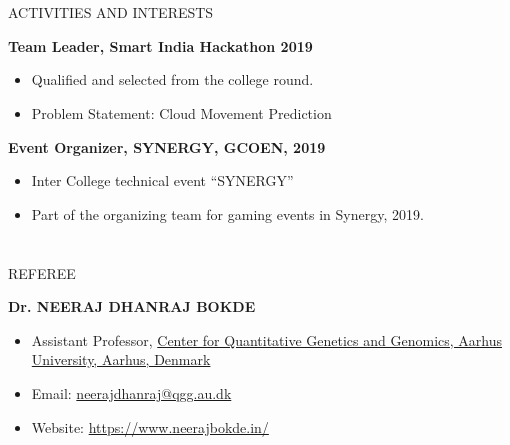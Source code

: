 \documentclass{my_cv}
\begin{document}
\begin{multicols}{2}
		
	\section{\faBaseballBall}{ACTIVITIES AND INTERESTS}
		
		\noindent
		\textbf{Team Leader, Smart India Hackathon 2019}
		\begin{itemize}
			\item Qualified and selected from the college round.
			\item Problem Statement: Cloud Movement Prediction
		\end{itemize}
		
		\noindent
		\textbf{Event Organizer, SYNERGY, GCOEN, 2019}
		\begin{itemize}
			\item Inter College technical event “SYNERGY”
			\item Part of the organizing team for gaming events in Synergy, 2019.
		\end{itemize}
	
	\columnbreak
	
	\section{\faUserFriends}{REFEREE}
	
		\textbf{Dr. NEERAJ DHANRAJ BOKDE}
		\begin{itemize}
			\item Assistant Professor, \href{http://qgg.au.dk/en/}{Center for Quantitative Genetics and Genomics, Aarhus University, Aarhus, Denmark}
			\item Email: \url{neerajdhanraj@qgg.au.dk}
			\item Website: \url{https://www.neerajbokde.in/}
		\end{itemize}
	
\end{multicols}
\end{document}

